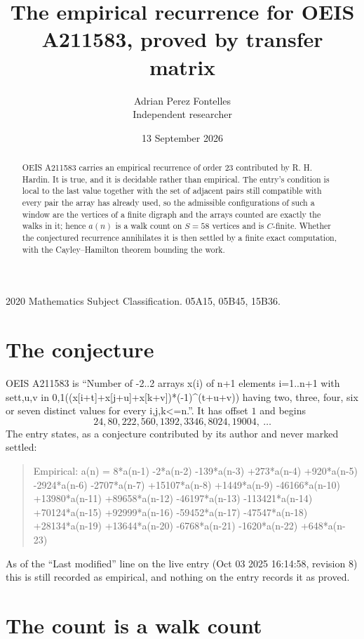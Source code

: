\documentclass[11pt,a4paper]{article}
\title{The empirical recurrence for OEIS A211583, proved by transfer matrix}
\author{Adrian Perez Fontelles\\ \small Independent researcher}
\date{13 September 2026}
\theoremstyle{plain}
\theoremstyle{definition}
\begin{document}
\maketitle

\begin{abstract}
OEIS A211583 carries an empirical recurrence of order $23$ contributed by R. H. Hardin. It is
true, and it is decidable rather than empirical. The entry's condition is local to the last value together with the set of adjacent pairs still compatible with every pair the array has already used, so
the admissible configurations of such a window are the vertices of a finite digraph and the
arrays counted are exactly the walks in it; hence $a(n)$ is a walk count on $S=58$ vertices
and is $C$-finite. Whether the conjectured recurrence annihilates it is then settled by a
finite exact computation, with the Cayley--Hamilton theorem bounding the work.
\end{abstract}

\noindent\small 2020 Mathematics Subject Classification. 05A15, 05B45, 15B36.\normalsize

\section{The conjecture}

OEIS A211583 is ``Number of -2..2 arrays x(i) of n+1 elements i=1..n+1 with set{t,u,v in 0,1}((x[i+t]+x[j+u]+x[k+v])*(-1)\^{}(t+u+v)) having two, three, four, six or seven distinct values for every i,j,k<=n.''. It has offset $1$ and begins
\[
24, 80, 222, 560, 1392, 3346, 8024, 19004,\ \dots
\]
The entry states, as a conjecture contributed by its author and never marked settled:
\begin{quote}
Empirical: a(n) = 8*a(n-1) -2*a(n-2) -139*a(n-3) +273*a(n-4) +920*a(n-5) -2924*a(n-6) -2707*a(n-7) +15107*a(n-8) +1449*a(n-9) -46166*a(n-10) +13980*a(n-11) +89658*a(n-12) -46197*a(n-13) -113421*a(n-14) +70124*a(n-15) +92999*a(n-16) -59452*a(n-17) -47547*a(n-18) +28134*a(n-19) +13644*a(n-20) -6768*a(n-21) -1620*a(n-22) +648*a(n-23)
\end{quote}
As of the ``Last modified'' line on the live entry (Oct 03 2025 16:14:58, revision 8) this is still
recorded as empirical, and nothing on the entry records it as proved.

\section{The count is a walk count}
\end{document}
